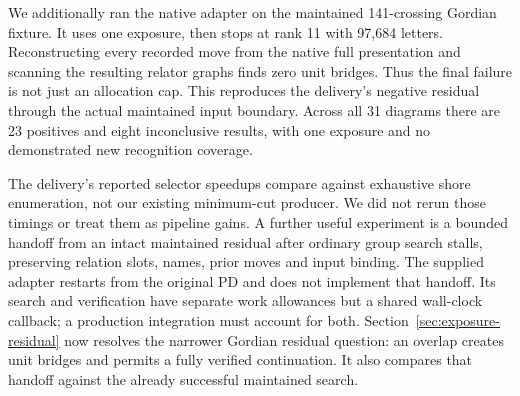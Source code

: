 We additionally ran the native adapter on the maintained 141-crossing
Gordian fixture. It uses one exposure, then stops at rank 11 with 97,684
letters. Reconstructing every recorded move from the native full presentation
and scanning the resulting relator graphs finds zero unit bridges. Thus the
final failure is not just an allocation cap. This reproduces the delivery's
negative residual through the actual maintained input boundary. Across all
31 diagrams there are 23 positives and eight inconclusive results, with one
exposure and no demonstrated new recognition coverage.

The delivery's reported selector speedups compare against exhaustive shore
enumeration, not our existing minimum-cut producer. We did not rerun those
timings or treat them as pipeline gains. A further useful experiment is a
bounded handoff from an intact maintained residual after ordinary group
search stalls, preserving relation slots, names, prior moves and input
binding. The supplied adapter restarts from the original PD and does not
implement that handoff. Its search and verification have separate work
allowances but a shared wall-clock callback; a production integration must
account for both. Section~\ref{sec:exposure-residual} now resolves the narrower
Gordian residual question: an overlap creates unit bridges and permits a
fully verified continuation. It also compares that handoff against the
already successful maintained search.
